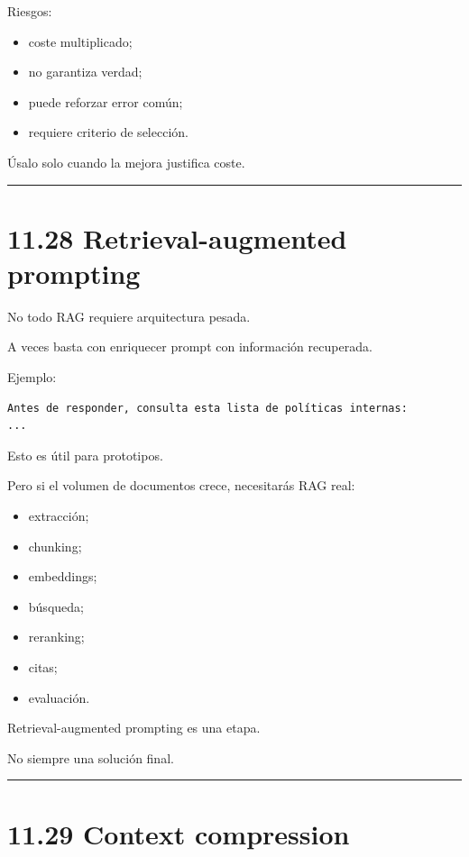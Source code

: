 Riesgos:

\begin{itemize}
\tightlist
\item
  coste multiplicado;
\item
  no garantiza verdad;
\item
  puede reforzar error común;
\item
  requiere criterio de selección.
\end{itemize}

Úsalo solo cuando la mejora justifica coste.

\begin{center}\rule{0.5\linewidth}{0.5pt}\end{center}

\section{11.28 Retrieval-augmented
prompting}\label{retrieval-augmented-prompting}

No todo RAG requiere arquitectura pesada.

A veces basta con enriquecer prompt con información recuperada.

Ejemplo:

\begin{lstlisting}
Antes de responder, consulta esta lista de políticas internas:
...
\end{lstlisting}

Esto es útil para prototipos.

Pero si el volumen de documentos crece, necesitarás RAG real:

\begin{itemize}
\tightlist
\item
  extracción;
\item
  chunking;
\item
  embeddings;
\item
  búsqueda;
\item
  reranking;
\item
  citas;
\item
  evaluación.
\end{itemize}

Retrieval-augmented prompting es una etapa.

No siempre una solución final.

\begin{center}\rule{0.5\linewidth}{0.5pt}\end{center}

\section{11.29 Context compression}\label{context-compression}

